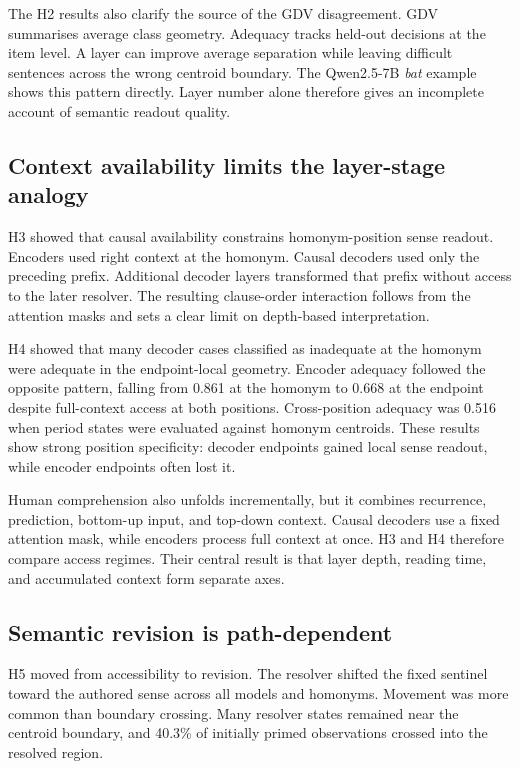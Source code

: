 \documentclass[conference]{IEEEtran}
\begin{document}
The H2 results also clarify the source of the GDV disagreement. GDV summarises
average class geometry. Adequacy tracks held-out decisions at the item level.
A layer can improve average separation while leaving difficult sentences
across the wrong centroid boundary. The Qwen2.5-7B \emph{bat} example shows
this pattern directly. Layer number alone therefore gives an incomplete account
of semantic readout quality.

\subsection{Context availability limits the layer-stage analogy}
\label{sec:discussion-context}

H3 showed that causal availability constrains homonym-position sense readout.
Encoders used right context at the homonym. Causal decoders used only the
preceding prefix. Additional decoder layers transformed that prefix without
access to the later resolver. The resulting clause-order interaction follows
from the attention masks and sets a clear limit on depth-based interpretation.

H4 showed that many decoder cases classified as inadequate at the homonym were
adequate in the endpoint-local geometry. Encoder adequacy followed the opposite
pattern, falling from 0.861 at the homonym to 0.668 at the endpoint despite
full-context access at both positions. Cross-position adequacy was 0.516 when
period states were evaluated against homonym centroids. These results show
strong position specificity: decoder endpoints gained local sense readout,
while encoder endpoints often lost it.

Human comprehension also unfolds incrementally, but it combines recurrence,
prediction, bottom-up input, and top-down context. Causal decoders use a fixed
attention mask, while encoders process full context at once. H3 and H4 therefore
compare access regimes. Their central result is that layer depth, reading time,
and accumulated context form separate axes.

\subsection{Semantic revision is path-dependent}
\label{sec:discussion-updating}

H5 moved from accessibility to revision. The resolver shifted the fixed
sentinel toward the authored sense across all models and homonyms. Movement was
more common than boundary crossing. Many resolver states remained near the
centroid boundary, and 40.3\% of initially primed observations crossed into the
resolved region.
\end{document}
